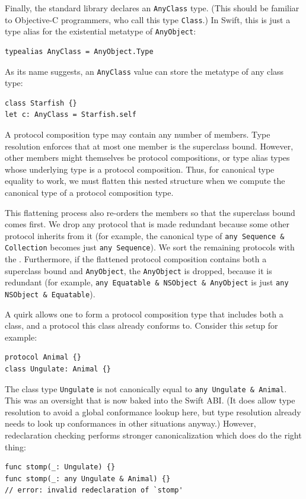 \documentclass[../generics]{subfiles}
\begin{document}
Finally, the standard library declares an \texttt{AnyClass} type. (This should be familiar to Objective-C programmers, who call this type \texttt{Class}.) In Swift, this is just a type alias for the existential metatype of \texttt{AnyObject}:
\begin{Verbatim}
typealias AnyClass = AnyObject.Type
\end{Verbatim}
As its name suggests, an \texttt{AnyClass} value can store the metatype of any class type:
\begin{Verbatim}
class Starfish {}
let c: AnyClass = Starfish.self
\end{Verbatim}

A protocol composition type may contain any number of members. Type resolution enforces that at most one member is the superclass bound. However, other members might themselves be protocol compositions, or type alias types whose underlying type is a protocol composition. Thus, for canonical type equality to work, we must flatten this nested structure when we compute the canonical type of a protocol composition type.

This flattening process also re-orders the members so that the superclass bound comes first. We drop any protocol that is made redundant because some other protocol inherits from it (for example, the canonical type of \texttt{any Sequence \& Collection} becomes just \texttt{any~Sequence}). We sort the remaining protocols with the . Furthermore, if the flattened protocol composition contains both a superclass bound and \texttt{AnyObject}, the \texttt{AnyObject} is dropped, because it is redundant (for example, \texttt{any Equatable \& NSObject \& AnyObject} is just \texttt{any NSObject \& Equatable}).

A quirk allows one to form a protocol composition type that includes both a class, and a protocol this class already conforms to. Consider this setup for example:
\begin{Verbatim}
protocol Animal {}
class Ungulate: Animal {}
\end{Verbatim}
The class type \texttt{Ungulate} is not canonically equal to \texttt{any Ungulate \& Animal}. This was an oversight that is now baked into the Swift ABI. (It does allow type resolution to avoid a global conformance lookup here, but type resolution already needs to look up conformances in other situations anyway.) However, redeclaration checking performs stronger canonicalization which does do the right thing:
\begin{Verbatim}
func stomp(_: Ungulate) {}
func stomp(_: any Ungulate & Animal) {}
// error: invalid redeclaration of `stomp'
\end{Verbatim}
\end{document}
